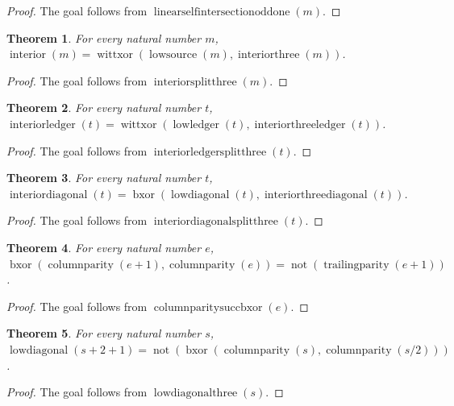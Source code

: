 \documentclass[11pt]{article}
\newtheorem{theorem}{Theorem}[section]
\theoremstyle{definition}
\begin{document}
\begin{proof}
The goal follows from \(\operatorname{linearselfintersectionoddone}(m)\).
\end{proof}
\begin{theorem}
\label{ll:observations:interior-split-three}
For every natural number \(m\), \(\operatorname{interior}(m) = \operatorname{wittxor}(\operatorname{lowsource}(m), \operatorname{interiorthree}(m))\).
\end{theorem}
\begin{proof}
The goal follows from \(\operatorname{interiorsplitthree}(m)\).
\end{proof}
\begin{theorem}
\label{ll:observations:interior-ledger-split-three}
For every natural number \(t\), \(\operatorname{interiorledger}(t) = \operatorname{wittxor}(\operatorname{lowledger}(t), \operatorname{interiorthreeledger}(t))\).
\end{theorem}
\begin{proof}
The goal follows from \(\operatorname{interiorledgersplitthree}(t)\).
\end{proof}
\begin{theorem}
\label{ll:observations:interior-diagonal-split-three}
For every natural number \(t\), \(\operatorname{interiordiagonal}(t) = \operatorname{bxor}(\operatorname{lowdiagonal}(t), \operatorname{interiorthreediagonal}(t))\).
\end{theorem}
\begin{proof}
The goal follows from \(\operatorname{interiordiagonalsplitthree}(t)\).
\end{proof}
\begin{theorem}
\label{ll:observations:column-parity-succ-bxor}
For every natural number \(e\), \(\operatorname{bxor}(\operatorname{columnparity}(e + 1), \operatorname{columnparity}(e)) = \operatorname{not}(\operatorname{trailingparity}(e + 1))\).
\end{theorem}
\begin{proof}
The goal follows from \(\operatorname{columnparitysuccbxor}(e)\).
\end{proof}
\begin{theorem}
\label{ll:observations:low-diagonal-three}
For every natural number \(s\), \(\operatorname{lowdiagonal}(s + 2 + 1) = \operatorname{not}(\operatorname{bxor}(\operatorname{columnparity}(s), \operatorname{columnparity}(s / 2)))\).
\end{theorem}
\begin{proof}
The goal follows from \(\operatorname{lowdiagonalthree}(s)\).
\end{proof}
\end{document}
